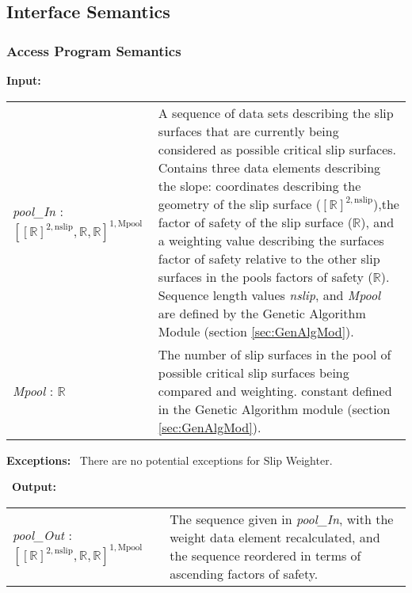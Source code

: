 \documentclass[12pt]{article}
\begin{document}
\subsection{Interface Semantics}

\subsubsection{Access Program Semantics}
\textbf{Input:} 
\renewcommand*{\arraystretch}{1.5}
\begin{longtable}{p{} p{}}
  \textit{pool\_In} : $[[\mathbb{R}]^{2,\text{nslip}}, \mathbb{R},
    \mathbb{R}]^{1,\text{Mpool}}$ & A sequence of data sets describing
  the slip surfaces that are currently being considered as possible
  critical slip surfaces. Contains three data elements describing the
  slope: coordinates describing the geometry of the slip surface
  ($[\mathbb{R}]^{2,\text{nslip}}$),the factor of safety of the slip
  surface ($\mathbb{R}$), and a weighting value describing the
  surfaces factor of safety relative to the other slip surfaces in the
  pools factors of safety ($\mathbb{R}$). Sequence length values
  \textit{nslip}, and \textit{Mpool} are defined by the Genetic
  Algorithm Module (section \ref{sec:GenAlgMod}). \\

  \textit{Mpool} : $\mathbb{R}$ & The number of slip surfaces in the
  pool of possible critical slip surfaces being compared and
  weighting. constant defined in the Genetic Algorithm module (section
  \ref{sec:GenAlgMod}).
\end{longtable}

\noindent \textbf{Exceptions:} ~\newline\noindent There are no
potential exceptions for Slip Weighter.

~\newline\noindent \textbf{Output:}
\renewcommand*{\arraystretch}{1.5}
\begin{longtable}{p{} p{}}
  \textit{pool\_Out} : $[[\mathbb{R}]^{2,\text{nslip}}, \mathbb{R},
    \mathbb{R}]^{1,\text{Mpool}}$ & The sequence given in
  \textit{pool\_In}, with the weight data element recalculated, and
  the sequence reordered in terms of ascending factors of safety. \\
\end{longtable}


\end{document}

